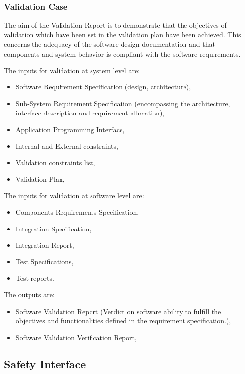 \documentclass{template/openetcs_report}
\begin{document}
\subsubsection{Validation Case}
The aim of the Validation Report is to demonstrate that the objectives
of validation which have been set in the validation plan have been
achieved. This concerns the adequacy of the software design
documentation and that components and system behavior is compliant
with the software requirements.

The inputs for validation at system level are:
\begin{itemize}
\item Software Requirement Specification (design, architecture),
\item Sub-System Requirement Specification (encompassing the architecture, 
interface description and requirement allocation),
\item Application Programming Interface,
\item Internal and External constraints,
\item Validation constraints list,
\item Validation Plan,
\end{itemize}

The inputs for validation at software level are:
\begin{itemize}
\item Components Requirements Specification,
\item Integration Specification,
\item Integration Report,
\item Test Specifications,
\item Test reports.
\end{itemize}


The outputs are:
\begin{itemize}
\item Software Validation Report (Verdict on software ability to fulfill 
the objectives and functionalities defined in the requirement specification.),
\item Software Validation Verification Report,
\end{itemize}

\subsection{Safety Interface}
\label{sec:safety-interface}
\end{document}
